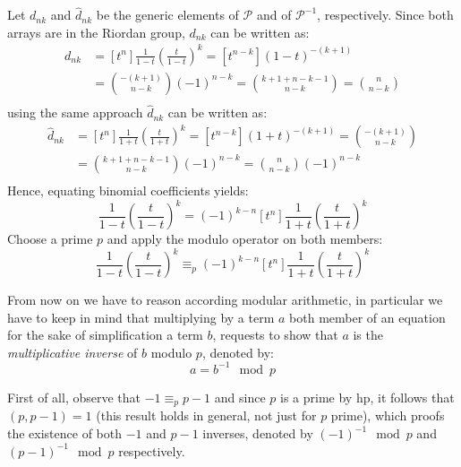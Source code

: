 Let $d_{nk}$ and $\hat{d}_{nk}$ be the generic elements of $\mathcal{P}$ and of
$\mathcal{P}^{-1}$, respectively. Since both arrays are in the Riordan group,
$d_{nk}$ can be written as:
\begin{displaymath}
    \begin{split}
        d_{nk} &= [t^n]\frac{1}{1-t}\left(\frac{t}{1-t}\right)^k = [t^{n-k}](1-t)^{-(k+1)} \\
            &= {{-(k+1)} \choose {n-k}}(-1)^{n-k} = {{k+1 +n-k -1} \choose {n-k}} = {{n} \choose {n-k}} \\
    \end{split}
\end{displaymath}
using the same approach $\hat{d}_{nk}$ can be written as:
\begin{displaymath}
  \begin{split}
    \hat{d}_{nk} &= [t^n]\frac{1}{1+t}\left(\frac{t}{1+t}\right)^k = [t^{n-k}](1+t)^{-(k+1)} = 
    {{-(k+1)} \choose {n-k}} \\
    &= {{k+1 +n-k -1} \choose {n-k}} (-1)^{n-k} = {{n} \choose {n-k}} (-1)^{n-k}\\
  \end{split}
\end{displaymath}
Hence, equating binomial coefficients yields:
\begin{displaymath}
  [t^n]\frac{1}{1-t}\left(\frac{t}{1-t}\right)^k = (-1)^{k-n}[t^n]\frac{1}{1+t}\left(\frac{t}{1+t}\right)^k 
\end{displaymath}
Choose a prime $p$ and apply the modulo operator on both members:
\begin{displaymath}
  [t^n]\frac{1}{1-t}\left(\frac{t}{1-t}\right)^k \equiv_{p} (-1)^{k-n}[t^n]\frac{1}{1+t}\left(\frac{t}{1+t}\right)^k 
\end{displaymath}


 From now on we have
to reason according modular arithmetic, in particular we have to keep in mind
that multiplying by a term $a$ both member of an equation for the sake of
simplification a term $b$, requests to show that $a$ is the
\emph{multiplicative inverse} of $b$ modulo $p$, denoted by: 
\begin{displaymath}
    a = b^{-1}\mod p
\end{displaymath}

First of all, observe that $-1 \equiv_{p} p-1$ and since $p$ is a
prime by hp, it follows that $(p, p-1)=1$ (this result holds in
general, not just for $p$ prime), which proofs the existence of
both $-1$ and $p-1$ inverses, denoted by $(-1)^{-1}\mod p$ and
$(p-1)^{-1}\mod p$ respectively.

